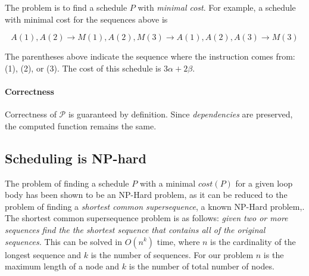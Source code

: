 The problem is to find a schedule $P$ with \emph{minimal cost}. For example, a schedule with minimal cost for the sequences above is 

$$ 
A(1), A(2) \rightarrow M(1), A(2), M(3) \rightarrow A(1), A(2), A(3) \rightarrow M(3)
$$

The parentheses above indicate the sequence where the instruction comes from: (1), (2), or (3). The cost of this schedule is $3\alpha + 2\beta$.

\paragraph{Correctness} Correctness of $\mathcal{P}$ is guaranteed by definition. Since \emph{dependencies} are preserved, the computed function remains the same.



\subsection{Scheduling is NP-hard}
\label{sec:np}


The problem of finding a schedule $P$ with a minimal $cost(P)$ for a given loop body has been shown to be an NP-Hard problem, as it can be reduced to the problem of finding a \emph{shortest common supersequence}, a known NP-Hard problem\cite{Maier1978},\cite{Vazirani2010}. The shortest common supersequence problem is as follows: {\it given two or more sequences find the the shortest sequence that contains all of the original sequences.} This can be solved in $O(n^k)$ time, where $n$ is the cardinality of the longest sequence and $k$ is the number of sequences. For our problem $n$ is the maximum length of a node and $k$ is the number of total number of nodes.

